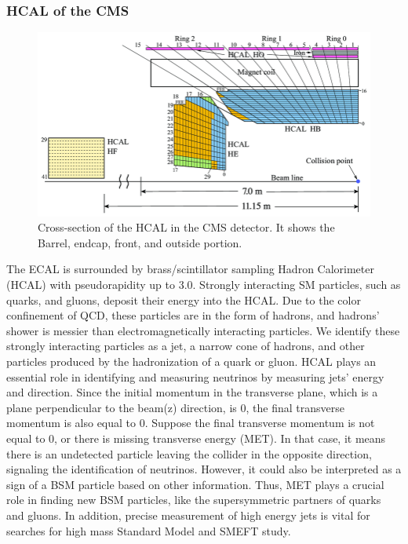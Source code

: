 \subsubsection{HCAL of the CMS}
\begin{figure}[h!]
  \caption{Cross-section of the HCAL in the CMS detector. It shows the Barrel, endcap, front, and outside portion. \cite{hcal}}
  \label{fig:HCAL}
  \centering
  \includegraphics[width=0.87\linewidth]{figs/HCAL.png}
\end{figure}
The ECAL is surrounded by brass/scintillator sampling Hadron Calorimeter (HCAL) with pseudorapidity up to 3.0.
Strongly interacting SM particles, such as quarks, and gluons, deposit their energy into the HCAL.
Due to the color confinement of QCD, these particles are in the form of hadrons, and hadrons' shower is messier than electromagnetically interacting particles.
We identify these strongly interacting particles as a jet, a narrow cone of hadrons, and other particles produced by the hadronization of a quark or gluon.
HCAL plays an essential role in identifying and measuring neutrinos by measuring jets' energy and direction.
Since the initial momentum in the transverse plane, which is a plane perpendicular to the beam(z) direction, is 0, the final transverse momentum is also equal to 0.
Suppose the final transverse momentum is not equal to 0, or there is missing transverse energy (MET). In that case, it means there is an undetected particle leaving the collider in the opposite direction, signaling the identification of neutrinos.
However, it could also be interpreted as a sign of a BSM particle based on other information.
Thus, MET plays a crucial role in finding new BSM particles, like the supersymmetric partners of quarks and gluons.
In addition, precise measurement of high energy jets is vital for searches for high mass Standard Model and SMEFT study.


